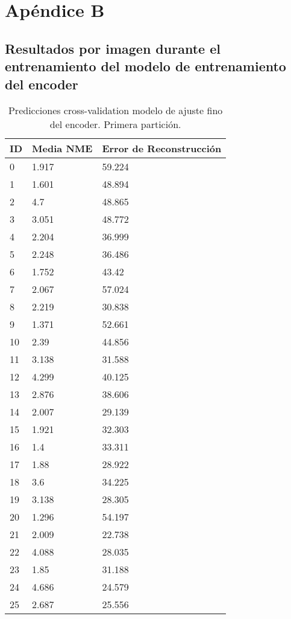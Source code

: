 
\chapter{Apéndice B}\label{ap:apendiceB}

\section{Resultados por imagen durante el entrenamiento del modelo de entrenamiento del encoder}

\begin{table}[!ht]
    \centering
    \caption{Predicciones cross-validation modelo de ajuste fino del encoder. Primera partición.}
    \begin{tabular}{|l|l|l|}
    \hline
    \cellcolor{gray!25}\textbf{ID} & \cellcolor{gray!25}\textbf{Media NME} & \cellcolor{gray!25}\textbf{Error de Reconstrucción} \\ \hline
        0 & 1.917 & 59.224 \\ \hline
        1 & 1.601 & 48.894 \\ \hline
        2 & 4.7 & 48.865 \\ \hline
        3 & 3.051 & 48.772 \\ \hline
        4 & 2.204 & 36.999 \\ \hline
        5 & 2.248 & 36.486 \\ \hline
        6 & 1.752 & 43.42 \\ \hline
        7 & 2.067 & 57.024 \\ \hline
        8 & 2.219 & 30.838 \\ \hline
        9 & 1.371 & 52.661 \\ \hline
        10 & 2.39 & 44.856 \\ \hline
        11 & 3.138 & 31.588 \\ \hline
        12 & 4.299 & 40.125 \\ \hline
        13 & 2.876 & 38.606 \\ \hline
        14 & 2.007 & 29.139 \\ \hline
        15 & 1.921 & 32.303 \\ \hline
        16 & 1.4 & 33.311 \\ \hline
        17 & 1.88 & 28.922 \\ \hline
        18 & 3.6 & 34.225 \\ \hline
        19 & 3.138 & 28.305 \\ \hline
        20 & 1.296 & 54.197 \\ \hline
        21 & 2.009 & 22.738 \\ \hline
        22 & 4.088 & 28.035 \\ \hline
        23 & 1.85 & 31.188 \\ \hline
        24 & 4.686 & 24.579 \\ \hline
        25 & 2.687 & 25.556 \\ \hline
    \end{tabular}
\end{table}

